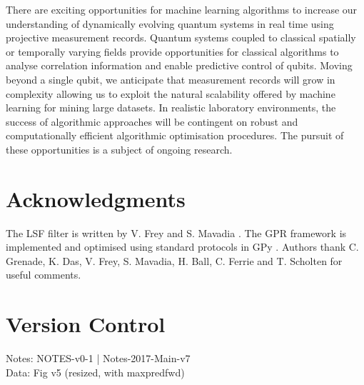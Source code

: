 There are exciting opportunities for machine learning algorithms to increase our understanding of dynamically evolving quantum systems in real time using  projective measurement records. Quantum systems coupled to classical spatially or temporally varying fields provide opportunities for classical algorithms to analyse correlation information and enable predictive control of qubits. Moving beyond a single qubit, we anticipate that measurement records will grow in complexity allowing us to exploit the natural scalability offered by machine learning for mining large datasets. In realistic laboratory environments, the success of algorithmic approaches will be contingent on robust and computationally efficient algorithmic optimisation procedures. The pursuit of these opportunities is a subject of ongoing research.

\section{Acknowledgments}
 The LSF filter is written by V. Frey and S. Mavadia \cite{mavadia2017}. The GPR framework is implemented and optimised using standard protocols in GPy \cite{gpy2014}. Authors thank C. Grenade, K. Das, V. Frey, S. Mavadia, H. Ball, C. Ferrie and T. Scholten for useful comments. 
 

\section{Version Control \label{sec:main:versioncontrol}}
Notes: NOTES-v0-1 | Notes-2017-Main-v7
\\
Data: Fig v5 (resized, with maxpredfwd)


